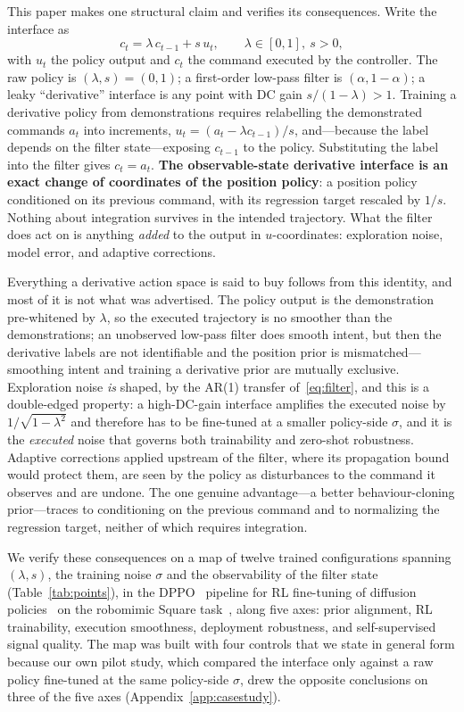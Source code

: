\documentclass{article}
\begin{document}
This paper makes one structural claim and verifies its consequences. Write the interface as
\begin{equation}
c_t=\lambda\,c_{t-1}+s\,u_t,\qquad \lambda\in[0,1],\ s>0,
\label{eq:filter}
\end{equation}
with $u_t$ the policy output and $c_t$ the command executed by the controller. The raw policy is $(\lambda,s)=(0,1)$; a first-order low-pass filter is $(\alpha,1-\alpha)$; a leaky ``derivative'' interface is any point with DC gain $s/(1-\lambda)>1$. Training a derivative policy from demonstrations requires relabelling the demonstrated commands $a_t$ into increments, $u_t=(a_t-\lambda c_{t-1})/s$, and---because the label depends on the filter state---exposing $c_{t-1}$ to the policy. Substituting the label into the filter gives $c_t=a_t$. \textbf{The observable-state derivative interface is an exact change of coordinates of the position policy}: a position policy conditioned on its previous command, with its regression target rescaled by $1/s$. Nothing about integration survives in the intended trajectory. What the filter does act on is anything \emph{added} to the output in $u$-coordinates: exploration noise, model error, and adaptive corrections.

Everything a derivative action space is said to buy follows from this identity, and most of it is not what was advertised. The policy output is the demonstration pre-whitened by $\lambda$, so the executed trajectory is no smoother than the demonstrations; an unobserved low-pass filter does smooth intent, but then the derivative labels are not identifiable and the position prior is mismatched---smoothing intent and training a derivative prior are mutually exclusive. Exploration noise \emph{is} shaped, by the AR(1) transfer of~\eqref{eq:filter}, and this is a double-edged property: a high-DC-gain interface amplifies the executed noise by $1/\sqrt{1-\lambda^2}$ and therefore has to be fine-tuned at a smaller policy-side $\sigma$, and it is the \emph{executed} noise that governs both trainability and zero-shot robustness. Adaptive corrections applied upstream of the filter, where its propagation bound would protect them, are seen by the policy as disturbances to the command it observes and are undone. The one genuine advantage---a better behaviour-cloning prior---traces to conditioning on the previous command and to normalizing the regression target, neither of which requires integration.

We verify these consequences on a map of twelve trained configurations spanning $(\lambda,s)$, the training noise $\sigma$ and the observability of the filter state (Table~\ref{tab:points}), in the DPPO~\citep{ren2024diffusionpolicypolicyoptimization} pipeline for RL fine-tuning of diffusion policies~\citep{chi2023diffusionpolicy} on the robomimic Square task~\citep{mandlekar2021robomimic}, along five axes: prior alignment, RL trainability, execution smoothness, deployment robustness, and self-supervised signal quality. The map was built with four controls that we state in general form because our own pilot study, which compared the interface only against a raw policy fine-tuned at the same policy-side $\sigma$, drew the opposite conclusions on three of the five axes (Appendix~\ref{app:casestudy}).
\end{document}
